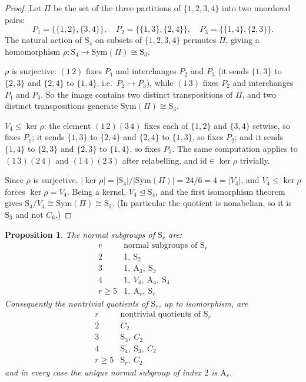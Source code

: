 \documentclass[11pt]{article}
\theoremstyle{plain}
\newtheorem{proposition}[theorem]{Proposition}
\theoremstyle{definition}
\theoremstyle{remark}
\numberwithin{equation}{section}
\newcommand{\Sym}{\mathrm{S}}
\newcommand{\Alt}{\mathrm{A}}
\newcommand{\normal}{\trianglelefteq}
\begin{document}
\begin{proof}
Let $\Pi$ be the set of the three partitions of $\{1,2,3,4\}$ into two unordered pairs:
\[
P_1 = \{\{1,2\},\{3,4\}\},\quad P_2 = \{\{1,3\},\{2,4\}\},\quad P_3 = \{\{1,4\},\{2,3\}\}.
\]
The natural action of $\Sym_4$ on subsets of $\{1,2,3,4\}$ permutes $\Pi$, giving a homomorphism
$\rho : \Sym_4 \to \mathrm{Sym}(\Pi) \cong \Sym_3$.

$\rho$ is surjective: $(1\,2)$ fixes $P_1$ and interchanges $P_2$ and $P_3$ (it sends $\{1,3\}$
to $\{2,3\}$ and $\{2,4\}$ to $\{1,4\}$, i.e.\ $P_2 \mapsto P_3$), while $(1\,3)$ fixes $P_2$ and
interchanges $P_1$ and $P_3$. So the image contains two distinct transpositions of $\Pi$, and
two distinct transpositions generate $\mathrm{Sym}(\Pi) \cong \Sym_3$.

$V_4 \le \ker\rho$: the element $(1\,2)(3\,4)$ fixes each of $\{1,2\}$ and $\{3,4\}$ setwise, so
fixes $P_1$; it sends $\{1,3\}$ to $\{2,4\}$ and $\{2,4\}$ to $\{1,3\}$, so fixes $P_2$; and it
sends $\{1,4\}$ to $\{2,3\}$ and $\{2,3\}$ to $\{1,4\}$, so fixes $P_3$. The same computation
applies to $(1\,3)(2\,4)$ and $(1\,4)(2\,3)$ after relabelling, and $\mathrm{id} \in \ker\rho$
trivially.

Since $\rho$ is surjective, $|\ker\rho| = |\Sym_4|/|\mathrm{Sym}(\Pi)| = 24/6 = 4 = |V_4|$, and
$V_4 \le \ker\rho$ forces $\ker\rho = V_4$. Being a kernel, $V_4 \normal \Sym_4$, and the first
isomorphism theorem gives $\Sym_4/V_4 \cong \mathrm{Sym}(\Pi) \cong \Sym_3$. (In particular the
quotient is nonabelian, so it is $\Sym_3$ and not $C_6$.)
\end{proof}

\begin{proposition}
\label{prop:normal}
The normal subgroups of $\Sym_r$ are:
\[
\begin{array}{c|l}
r & \text{normal subgroups of } \Sym_r\\ \hline
2 & 1,\ \Sym_2\\
3 & 1,\ \Alt_3,\ \Sym_3\\
4 & 1,\ V_4,\ \Alt_4,\ \Sym_4\\
r \ge 5 & 1,\ \Alt_r,\ \Sym_r
\end{array}
\]
Consequently the nontrivial quotients of $\Sym_r$, up to isomorphism, are
\begin{equation}
\label{eq:quotients}
\begin{array}{c|l}
r & \text{nontrivial quotients of } \Sym_r\\ \hline
2 & C_2\\
3 & \Sym_3,\ C_2\\
4 & \Sym_4,\ \Sym_3,\ C_2\\
r \ge 5 & \Sym_r,\ C_2
\end{array}
\end{equation}
and in every case the unique normal subgroup of index $2$ is $\Alt_r$.
\end{proposition}
\end{document}
